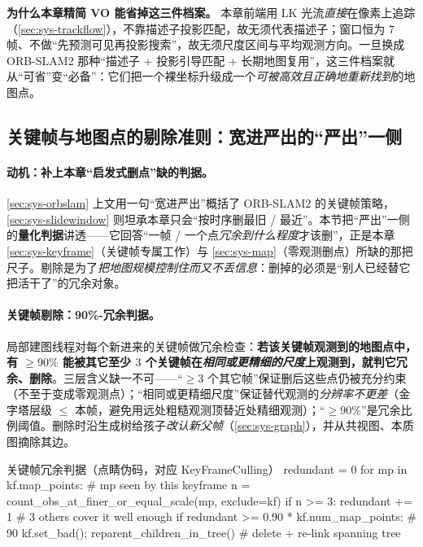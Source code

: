 \begin{insight}
\textbf{为什么本章精简 VO 能省掉这三件档案。}
本章前端用 LK 光流\emph{直接}在像素上追踪（\cref{sec:sys-trackflow}），不靠描述子投影匹配，故无须代表描述子；窗口恒为 $7$ 帧、不做“先预测可见再投影搜索”，故无须尺度区间与平均观测方向。一旦换成 ORB-SLAM2 那种“描述子 + 投影引导匹配 + 长期地图复用”，这三件档案就从“可省”变“必备”：它们把一个裸坐标升级成一个\emph{可被高效且正确地重新找到}的地图点。
\end{insight}

\subsection{关键帧与地图点的剔除准则：宽进严出的“严出”一侧}
\label{sec:sys-culling}

\paragraph{动机：补上本章“启发式删点”缺的判据。}
\cref{sec:sys-orbslam} 上文用一句“宽进严出”概括了 ORB-SLAM2 的关键帧策略，\cref{sec:sys-slidewindow} 则坦承本章只会“按时序删最旧 / 最近”。本节把“严出”一侧的\textbf{量化判据}讲透——它回答“一帧 / 一个点\emph{冗余到什么程度}才该删”，正是本章 \cref{sec:sys-keyframe}（关键帧专属工作）与 \cref{sec:sys-map}（零观测删点）所缺的那把尺子。剔除是为了\emph{把地图规模控制住而又不丢信息}：删掉的必须是“别人已经替它把活干了”的冗余对象。

\paragraph{关键帧剔除：90\%-冗余判据。}
局部建图线程对每个新进来的关键帧做冗余检查：\textbf{若该关键帧观测到的地图点中，有 $\ge 90\%$ 能被其它至少 $3$ 个关键帧在\emph{相同或更精细的尺度}上观测到，就判它冗余、删除}。三层含义缺一不可——“$\ge 3$ 个其它帧”保证删后这些点仍被充分约束（不至于变成零观测点）；“相同或更精细尺度”保证替代观测的\emph{分辨率不更差}（金字塔层级 $\le$ 本帧，避免用远处粗糙观测顶替近处精细观测）；“$\ge 90\%$”是冗余比例阈值。删除时沿生成树给孩子\emph{改认新父帧}（\cref{sec:sys-graph}），并从共视图、本质图摘除其边。
\begin{codebox}[text]{关键帧冗余判据（点睛伪码，对应 KeyFrameCulling）}
redundant = 0
for mp in kf.map_points:                      # mp seen by this keyframe
    n = count_obs_at_finer_or_equal_scale(mp, exclude=kf)
    if n >= 3: redundant += 1                  # 3 others cover it well enough
if redundant >= 0.90 * kf.num_map_points:      # 90%
    kf.set_bad(); reparent_children_in_tree()  # delete + re-link spanning tree
\end{codebox}

